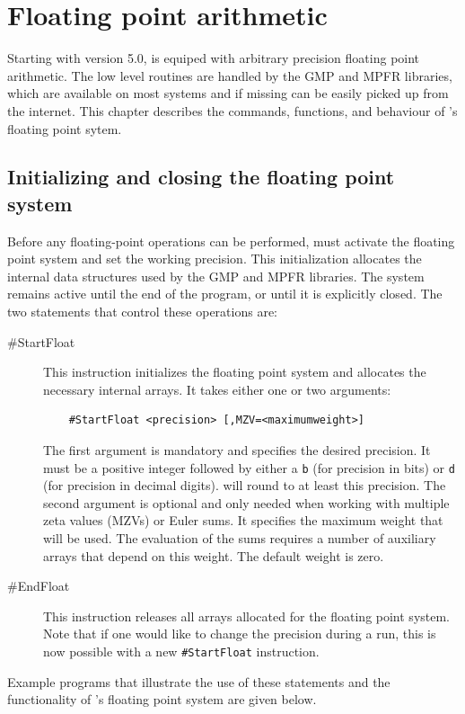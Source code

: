 
\chapter{Floating point arithmetic}
\label{floatingpoint}

Starting with version 5.0, \FORM{} is equiped with arbitrary precision floating point 
arithmetic. The low level routines are handled by the GMP and MPFR libraries, 
which are available on most systems and if missing can be easily picked up 
from the internet. This chapter describes the commands, functions, and behaviour
of \FORM's floating point sytem.

\section{Initializing and closing the floating point system}
Before any floating-point operations can be performed, \FORM{} must activate the 
floating point system and set the working precision. This initialization allocates 
the internal data structures used by the GMP and MPFR libraries. The system remains 
active until the end of the program, or until it is explicitly closed.
The two statements that control these operations are:
\begin{description}
\item[\#StartFloat] This instruction initializes the floating 
point system and allocates the necessary internal arrays. 
It takes either one or two arguments:
\begin{verbatim}
    #StartFloat <precision> [,MZV=<maximumweight>]
\end{verbatim}
The first argument is mandatory and specifies the desired precision. It must 
be a positive integer followed by either a \texttt{b} (for precision in bits) 
or \texttt{d} (for precision in decimal digits).
\FORM{} will round to at least this precision. 
The second argument is optional and only needed when working with multiple 
zeta values (MZVs) or Euler sums. It specifies the maximum weight 
that will be used. The evaluation of the sums requires a 
number of auxiliary arrays that depend on this weight. The default weight is zero. 
\item[\#EndFloat] This instruction releases all arrays allocated for the 
floating point system. Note that if one would like to change the precision during a run, 
this is now possible with a new \texttt{\#StartFloat} instruction. 
\end{description}
Example programs that illustrate the use of these statements and the 
functionality of \FORM's floating point system are given below. 


